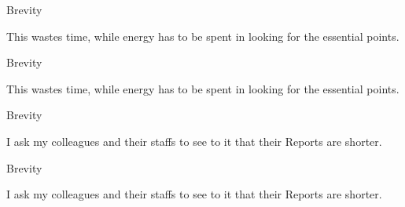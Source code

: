 \documentclass[
  ignorenonframetext,
  aspectratio=169]{beamer}
\begin{document}
\begin{frame}{Brevity}
\protect\hypertarget{brevity-3}{}
\Large

This wastes time, while energy has to be spent in looking for the
essential points.

\par

\vfill\Huge

\raggedleft
{}

\vfill

\mbox{}
\end{frame}

\begin{frame}{Brevity}
\protect\hypertarget{brevity-4}{}
\Large

This \textcolor{softblue}{wastes time}, while energy has to be spent in
looking for \textcolor{softblue}{the essential points}.

\par

\vfill\Huge

\raggedleft
{}

\vfill
\end{frame}

\begin{frame}{Brevity}
\protect\hypertarget{brevity-5}{}
\Large

I ask my colleagues and their staffs to see to it that their Reports are
shorter.

\vfill\Huge

\raggedleft
{}

\vfill
\end{frame}

\begin{frame}{Brevity}
\protect\hypertarget{brevity-6}{}
\Large

I ask my colleagues and their staffs to see to it that
\textcolor{softblue}{their Reports are shorter}.

\vfill\Huge

\raggedleft
{}

\vfill
\end{frame}
\end{document}
